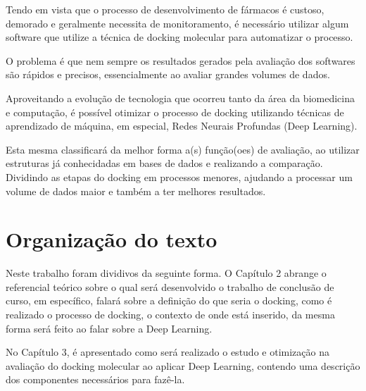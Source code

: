 \documentclass[tcc, capa]{texucpel}
\begin{document}
Tendo em vista que o processo de desenvolvimento de fármacos é custoso, demorado e geralmente necessita de monitoramento, é necessário utilizar algum software que utilize a técnica de docking molecular para automatizar o processo.

O problema é que nem sempre os resultados gerados pela avaliação dos softwares são rápidos e precisos, essencialmente ao avaliar grandes volumes de dados.

Aproveitando a evolução de tecnologia que ocorreu tanto da área da biomedicina e computação, é possível otimizar o processo de docking utilizando técnicas de aprendizado de máquina, em especial, Redes Neurais Profundas (Deep Learning).

Esta mesma classificará da melhor forma a(s) função(oes) de avaliação, ao utilizar estruturas já conhecidadas em bases de dados e realizando a comparação.
Dividindo as etapas do docking em processos menores, ajudando a processar um volume de dados maior e também a ter melhores resultados.


\section{Organização do texto}

Neste trabalho foram dividivos da seguinte forma.
O Capítulo 2 abrange o referencial teórico sobre o qual será desenvolvido o trabalho de conclusão de curso, em específico, falará sobre a definição do que seria o docking, como é realizado o processo de docking, o contexto de onde está inserido, da mesma forma será feito ao falar sobre a Deep Learning.

No Capítulo 3, é apresentado como será realizado o estudo e otimização na avaliação do docking molecular ao aplicar Deep Learning, contendo uma descrição dos componentes necessários para fazê-la.
\end{document}
